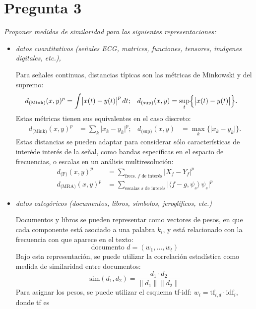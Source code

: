 \documentclass[spanish]{article}
\newcommand{\pregunta}{\textit}
\newcommand{\abs}[1]{\lvert#1\rvert}
\newcommand{\norm}[1]{\lVert#1\rVert}
\begin{document}
\section*{Pregunta 3}
\pregunta{Proponer medidas de similaridad para las siguientes representaciones:}
    \begin{itemize}
        \item \pregunta{datos cuantitativos
            (señales ECG, matrices, funciones, tensores, imágenes digitales, etc.),}

            Para señales continuas, distancias típicas son las métricas de Minkowski y
            del supremo:
            \begin{align}
                d_{\text{(Mink)}}(x, y)^p &= \int\bigl\lvert x(t) - y(t)\bigr\rvert^{p}\,dt; &
                d_{\text{(sup)}}(x, y) &= \sup_t \Bigl\{\bigl\lvert x(t) - y(t)\bigr\rvert\Bigr\}.
            \end{align}
            Estas métricas tienen sus equivalentes en el caso discreto:
            \begin{align}
                d_{\text{(Mink)}}(x, y)^p &= \sum_k \abs{x_k - y_k}^p; &
                d_{\text{(sup)}}(x, y) &= \max_k\bigl\{\abs{x_k - y_k}\bigr\}.
            \end{align}
            Estas distancias se pueden adaptar para considerar sólo características de interéde
            interés de la
            señal, como bandas específicas en el espacio de frecuencias, o escalas en un análisis
            multiresolución:
            \begin{align}
                d_{\text{(F)}}(x, y)^p   &= 
                    \sum_{\text{frecs. $f$ de interés}} \abs{X_f - Y_f}^p \\
                d_{\text{(MRA)}}(x, y)^p &= 
                    \sum_{\text{escalas $s$ de interés}}
                    \bigl\lvert\langle f - g, \psi_s \rangle\,\psi_s \bigr\rvert^p
            \end{align}

        \item \pregunta{datos categóricos
            (documentos, libros, símbolos, jeroglíficos, etc.)}

            Documentos y libros se pueden representar como vectores de pesos, en que cada componente
            está asociado a una palabra $k_i$, y está relacionado con la frecuencia con que aparece en el
            texto:
            \begin{equation}
                \text{documento $d$} = (w_1, \ldots, w_t)
            \end{equation}
            Bajo esta representación, se puede utilizar la correlación estadística como medida de
            similaridad entre documentos:
            \begin{equation}
                \text{sim}(d_1, d_2) = \frac{d_1\cdot d_2}{\norm{d_1}\norm{d_2}}
            \end{equation}
            Para asignar los pesos, se puede utilizar el esquema tf-idf:  $w_i =
            \text{tf}_{i,d}\cdot\text{idf}_i$, donde tf es 



\end{itemize}
\end{document}
